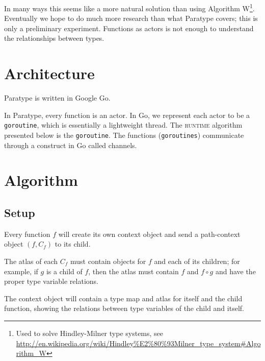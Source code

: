\documentclass[10pt]{article}
\begin{document}
In many ways this seems like a more natural solution than using Algorithm
W\footnote{Used to solve Hindley-Milner type systems, see
	\url{http://en.wikipedia.org/wiki/Hindley\%E2\%80\%93Milner_type_system\#Algorithm_W}}. 
Eventually we hope to do much more
research than what Paratype covers; this is only a preliminary experiment.
Functions as actors is not enough to understand the relationships between
types.

\section{Architecture}

Paratype is written in Google Go.

In Paratype, every function is an actor. In Go, we represent each actor to be a
\texttt{goroutine}, which is essentially a lightweight thread. The
\textsc{runtime} algorithm presented below is the \texttt{goroutine}. The
functions (\texttt{goroutines}) communicate through a construct in Go called
channels.

\pagebreak
\section{Algorithm}

\subsection{Setup}

Every function $f$ will create its own context object and send a path-context
object $(f, C_f)$ to its child.

The atlas of each $C_f$ must contain objects for $f$ and each of its
children; for example, if $g$ is a child of $f$, then the atlas must contain
$f$ and $f \circ g$ and have the proper type variable relations.

The context object will contain a type map and atlas for itself and the child
function, showing the relations between type variables of the child and itself.
\end{document}
